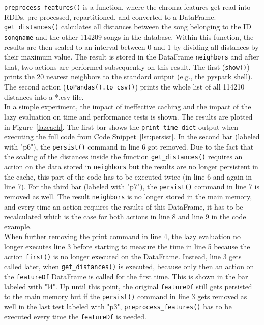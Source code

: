 \noindent \lstinline{preprocess_features()} is a function, where the chroma features get read into RDDs, pre-processed, repartitioned, and converted to a DataFrame. \lstinline{get_distances()} calculates all distances between the song belonging to the ID \lstinline{songname} and the other 114209 songs in the database. Within this function, the results are then scaled to an interval between 0 and 1 by dividing all distances by their maximum value. The result is stored in the DataFrame \lstinline{neighbors} and after that, two actions are performed subsequently on this result. The first (\lstinline{show()}) prints the 20 nearest neighbors to the standard output (e.g., the pyspark shell). The second action (\lstinline{toPandas().to_csv()}) prints the whole list of all 114210 distances into a *.csv file.\\
In a simple experiment, the impact of ineffective caching and the impact of the lazy evaluation on time and performance tests is shown. The results are plotted in Figure~\ref{lazcach}. The first bar shows the \lstinline{print time_dict} output when executing the full code from Code Snippet~\ref{lst:persist}. In the second bar (labeled with "p6"), the \lstinline{persist()} command in line 6 got removed. Due to the fact that the scaling of the distances inside the function \lstinline{get_distances()} requires an action on the data stored in \lstinline{neighbors} but the results are no longer persistent in the cache, this part of the code has to be executed twice (in line 6 and again in line 7). For the third bar (labeled with "p7"), the \lstinline{persist()} command in line 7 is removed as well. The result \lstinline{neighbors} is no longer stored in the main memory, and every time an action requires the results of this DataFrame, it has to be recalculated which is the case for both actions in line 8 and line 9 in the code example.\\
When further removing the print command in line 4, the lazy evaluation no longer executes line 3 before starting to measure the time in line 5 because the action \lstinline{first()} is no longer executed on the DataFrame. Instead, line 3 gets called later, when \lstinline{get_distances()} is executed, because only then an action on the \lstinline{featureDf} DataFrame is called for the first time. This is shown in the bar labeled with "l4". Up until this point, the original \lstinline{featureDf} still gets persisted to the main memory but if the \lstinline{persist()} command in line 3 gets removed as well in the last test labeled with "p3", \lstinline{preprocess_features()} has to be executed every time the \lstinline{featureDf} is needed.  

